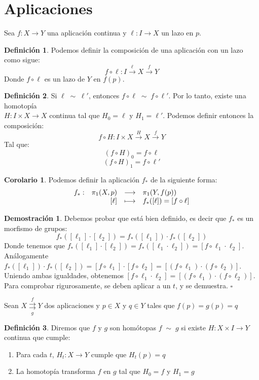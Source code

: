 \documentclass[12pt,twoside]{report}
\theoremstyle{azul}
\theoremstyle{azul2}
\theoremstyle{plain}
\theoremstyle{definition}
\newtheorem*{defi}{Definición}
\newtheorem*{dem}{Demostración}
\newtheorem*{cor}{Corolario}
\theoremstyle{remark}
\newcommand\bigpi{\mathlarger{\pi}}
\begin{document}
\section{Aplicaciones}
Sea $f:X \longrightarrow Y$ una aplicación continua y $\ell: I \longrightarrow X$ un lazo en $p$. 
\begin{defi}
Podemos definir la composición de una aplicación con un lazo como sigue:
$$ f \circ \ell : I \stackrel{\ell}{\longrightarrow} X \stackrel{f}{\longrightarrow} Y$$
Donde $f \circ \ell$ es un lazo de $Y$ en $f(p)$.
\end{defi}
\begin{defi}
Si $\ell \; \sim \; \ell'$, entonces $f \circ \ell \; \sim \; f \circ \ell'$. Por lo tanto, existe una homotopía \\ $H: I \times X \longrightarrow X$ continua tal que $H_0 = \ell$ y $H_1 = \ell'$. Podemos definir entonces la composición:
$$f \circ H: I \times X \stackrel{H}{\longrightarrow} X \stackrel{f}{\longrightarrow} Y$$
Tal que:
$$(f \circ H)_0 = f \circ \ell$$
$$(f \circ H)_1 = f \circ \ell'$$
\end{defi}
\begin{cor}
Podemos definir la aplicación $f_*$ de la siguiente forma:
$$\begin{array}{rrcl}
     f_*:  & \bigpi _1(X, p) & \longrightarrow & \bigpi_1(Y, f(p)) \\
     \; & [\ell] & \longmapsto & f_*([\ell])=[f \circ \ell]
\end{array}$$
\end{cor}
\begin{dem}
Debemos probar que está bien definido, es decir que $f_*$ es un morfismo de grupos:
$$f_*([\ell_1] \cdot [\ell_2]) = f_*([\ell_1]) \cdot f_*([\ell_2])$$
Donde tenemos que $f_*([\ell_1] \cdot [\ell_2]) = f_*([\ell_1 \cdot \ell_2]) = [f \circ \ell_1 \cdot \ell_2]$. Análogamente \\ $f_*([\ell_1]) \cdot f_*([\ell_2])= [f \circ \ell_1] \cdot [f \circ \ell_2]=[(f \circ \ell_1) \cdot (f \circ \ell_2)]$. Uniendo ambas igualdades, obtenemos $[f \circ \ell_1 \cdot \ell_2] = [(f \circ \ell_1) \cdot (f \circ \ell_2)]$. Para comprobar rigurosamente, se deben aplicar a un $t$, y se demuestra. \hfill $\square$
\end{dem}
Sean $X \underset{g}{\overset{f}{\rightrightarrows}} Y$ dos aplicaciones y $p \in X$ y $q \in Y$ tales que $f(p)=g(p)=q$
\begin{defi} 
Diremos que $f$ y $g$ son homótopas $f \; \sim \; g$ si existe $H : X \times I \longrightarrow Y$ continua que cumple:
\begin{enumerate}
    \item Para cada $t$, $H_t: X \longrightarrow Y$ cumple que $H_t(p)=q$
    \item La homotopía transforma $f$ en $g$ tal que $H_0=f$ y $H_1=g$
\end{enumerate}
\end{defi}
\end{document}
